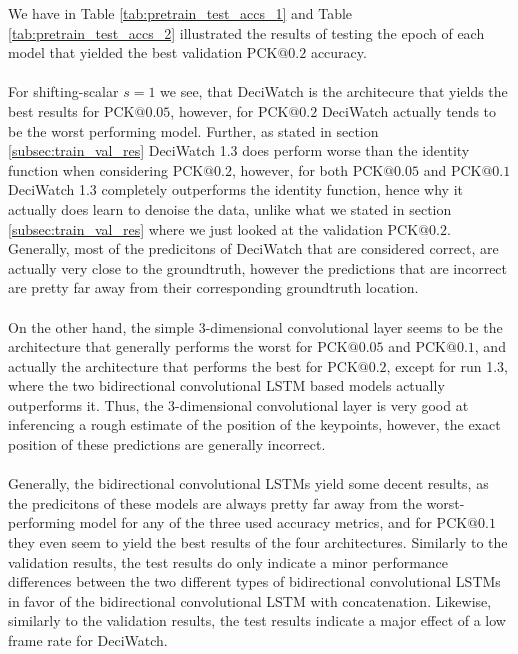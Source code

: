 \documentclass[./main.tex]{subfiles}
\begin{document}
\noindent We have in Table \ref{tab:pretrain_test_accs_1} and Table \ref{tab:pretrain_test_accs_2} illustrated the results of testing the epoch of each model that yielded the best validation PCK$@0.2$ accuracy.
\\
\\
For shifting-scalar $s = 1$ we see, that DeciWatch is the architecure that yields the best results for PCK$@0.05$, however, for PCK$@0.2$ DeciWatch actually tends to be the worst performing model. Further, as stated in section \ref{subsec:train_val_res} DeciWatch 1.3 does perform worse than the identity function when considering PCK$@0.2$, however, for both PCK$@0.05$ and PCK$@0.1$ DeciWatch 1.3 completely outperforms the identity function, hence why it actually does learn to denoise the data, unlike what we stated in section \ref{subsec:train_val_res} where we just looked at the validation PCK$@0.2$. Generally, most of the predicitons of DeciWatch that are considered correct, are actually very close to the groundtruth, however the predictions that are incorrect are pretty far away from their corresponding groundtruth location.
\\
\\
On the other hand, the simple 3-dimensional convolutional layer seems to be the architecture that generally performs the worst for PCK$@0.05$ and PCK$@0.1$, and actually the architecture that performs the best for PCK$@0.2$, except for run 1.3, where the two bidirectional convolutional LSTM based models actually outperforms it. Thus, the 3-dimensional convolutional layer is very good at inferencing a rough estimate of the position of the keypoints, however, the exact position of these predictions are generally incorrect.
\\
\\
Generally, the bidirectional convolutional LSTMs yield some decent results, as the predicitons of these models are always pretty far away from the worst-performing model for any of the three used accuracy metrics, and for PCK$@0.1$ they even seem to yield the best results of the four architectures. Similarly to the validation results, the test results do only indicate a minor performance differences between the two different types of bidirectional convolutional LSTMs in favor of the bidirectional convolutional LSTM with concatenation. Likewise, similarly to the validation results, the test results indicate a major effect of a low frame rate for DeciWatch. 
\\
\\
\end{document}
